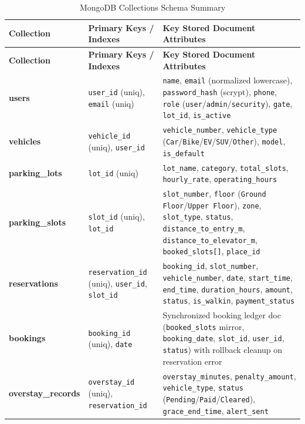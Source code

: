 \documentclass[12pt,a4paper,oneside]{report}
\begin{document}
\begin{longtable}{>{\bfseries\ttfamily}p{3.6cm} p{4.2cm} p{6.2cm}}
\caption{MongoDB Collections Schema Summary}
\label{tab:mongo_schema}\\
\toprule
\textbf{Collection} & \textbf{Primary Keys / Indexes} & \textbf{Key Stored Document Attributes} \\
\midrule
\endfirsthead
\toprule
\textbf{Collection} & \textbf{Primary Keys / Indexes} & \textbf{Key Stored Document Attributes} \\
\midrule
\endhead
users & \texttt{user\_id} (uniq), \texttt{email} (uniq) & \texttt{name}, \texttt{email} (normalized lowercase), \texttt{password\_hash} (scrypt), \texttt{phone}, \texttt{role} (\texttt{user}/\texttt{admin}/\texttt{security}), \texttt{gate}, \texttt{lot\_id}, \texttt{is\_active} \\
vehicles & \texttt{vehicle\_id} (uniq), \texttt{user\_id} & \texttt{vehicle\_number}, \texttt{vehicle\_type} (\texttt{Car}/\texttt{Bike}/\texttt{EV}/\texttt{SUV}/\texttt{Other}), \texttt{model}, \texttt{is\_default} \\
parking\_lots & \texttt{lot\_id} (uniq) & \texttt{lot\_name}, \texttt{category}, \texttt{total\_slots}, \texttt{hourly\_rate}, \texttt{operating\_hours} \\
parking\_slots & \texttt{slot\_id} (uniq), \texttt{lot\_id} & \texttt{slot\_number}, \texttt{floor} (\texttt{Ground Floor}/\texttt{Upper Floor}), \texttt{zone}, \texttt{slot\_type}, \texttt{status}, \texttt{distance\_to\_entry\_m}, \texttt{distance\_to\_elevator\_m}, \texttt{booked\_slots[]}, \texttt{place\_id} \\
reservations & \texttt{reservation\_id} (uniq), \texttt{user\_id}, \texttt{slot\_id} & \texttt{booking\_id}, \texttt{slot\_number}, \texttt{vehicle\_number}, \texttt{date}, \texttt{start\_time}, \texttt{end\_time}, \texttt{duration\_hours}, \texttt{amount}, \texttt{status}, \texttt{is\_walkin}, \texttt{payment\_status} \\
bookings & \texttt{booking\_id} (uniq), \texttt{date} & Synchronized booking ledger doc (\texttt{booked\_slots} mirror, \texttt{booking\_date}, \texttt{slot\_id}, \texttt{user\_id}, \texttt{status}) with rollback cleanup on reservation error \\
overstay\_records & \texttt{overstay\_id} (uniq), \texttt{reservation\_id} & \texttt{overstay\_minutes}, \texttt{penalty\_amount}, \texttt{vehicle\_type}, \texttt{status} (\texttt{Pending}/\texttt{Paid}/\texttt{Cleared}), \texttt{grace\_end\_time}, \texttt{alert\_sent} \\

\end{longtable}
\end{document}
